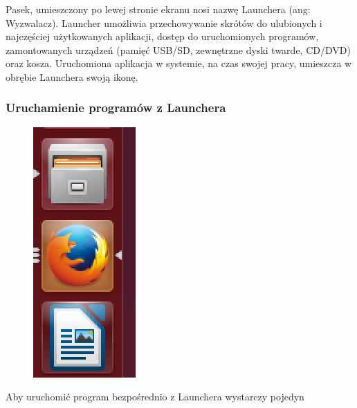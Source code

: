 Pasek, umieszczony po lewej stronie ekranu nosi nazwę Launchera (ang: \textcolor{ubuntu_orange}{Wyzwalacz}). Launcher umożliwia przechowywanie skrótów do ulubionych i najczęściej użytkowanych aplikacji, dostęp do uruchomionych programów, zamontowanych urządzeń (pamięć USB/SD, zewnętrzne dyski twarde, CD/DVD) oraz kosza. Uruchomiona aplikacja w systemie, na czas swojej pracy, umieszcza w obrębie Launchera swoją ikonę.

\subsubsection{Uruchamienie programów z Launchera}
\begin{figure}
                \includegraphics[width=\linewidth]{images/unity_launcher_programy.png}
\end{figure}

Aby uruchomić program bezpośrednio z Launchera wystarczy pojedyn